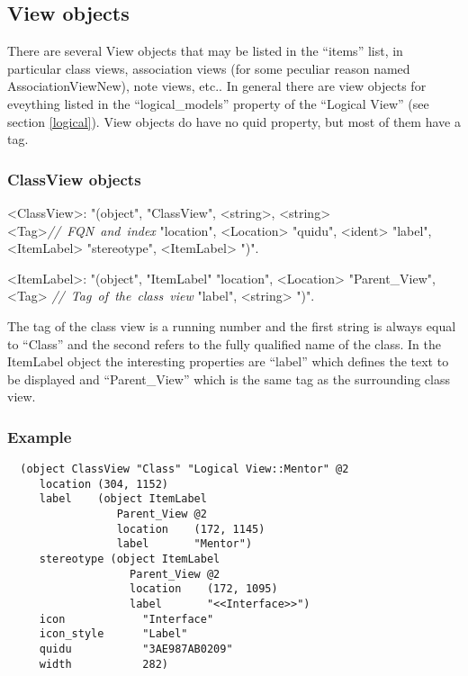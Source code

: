 \documentclass{article}
\newcommand\comment[1]{\emph{\mbox{// #1}}\newline}
\newenvironment{mygrammar}{\begin{grammar}%
      [(colon){ $\rightarrow$}]%
      [(semicolon)$|$]%
      [(comma){ }]%
      [(period){\\}]%
      [(quote){\begin{bf}}{\end{bf}}]%
      [(nonterminal){$\langle$}{$\rangle$}]}%
      {\end{grammar}}
\begin{document}
\subsection{View objects}

There are several View objects that may be listed in the ``items'' list,
in particular class views, association views (for some peculiar reason
named AssociationViewNew), note views, etc.. In general there are view
objects for eveything listed in the ``logical\_models'' property of the ``Logical
View'' (see section \ref{logical}). View objects do have no quid
property, but most of them have a tag.

\subsubsection{ClassView objects}

\begin{mygrammar}
<ClassView>: "(object", "ClassView", <string>, <string> <Tag>\comment{FQN and index}
         "location",           <Location>\newline
         "quidu",              <ident>\newline
         "label",              <ItemLabel>\newline
         "stereotype",         <ItemLabel>\newline
")".

<ItemLabel>: "(object", "ItemLabel"\newline
         "location",           <Location>\newline
         "Parent\_View",       <Tag> \comment{Tag of the class view}
         "label",              <string>\newline
")".
\end{mygrammar}

The tag of the class view is a running number and the first string is
always equal to ``Class'' and the second refers to the fully qualified
name of the class. In the ItemLabel object the interesting properties
are ``label'' which defines the text to be displayed and
``Parent\_View'' which is the same tag as the surrounding class view.

\subsubsection{Example}
\begin{verbatim}
  (object ClassView "Class" "Logical View::Mentor" @2
     location (304, 1152)
     label    (object ItemLabel
                 Parent_View @2
                 location    (172, 1145)
                 label       "Mentor")
     stereotype (object ItemLabel
                   Parent_View @2
                   location    (172, 1095)
                   label       "<<Interface>>")
     icon            "Interface"
     icon_style      "Label"
     quidu           "3AE987AB0209"
     width           282)
\end{verbatim}
\end{document}
